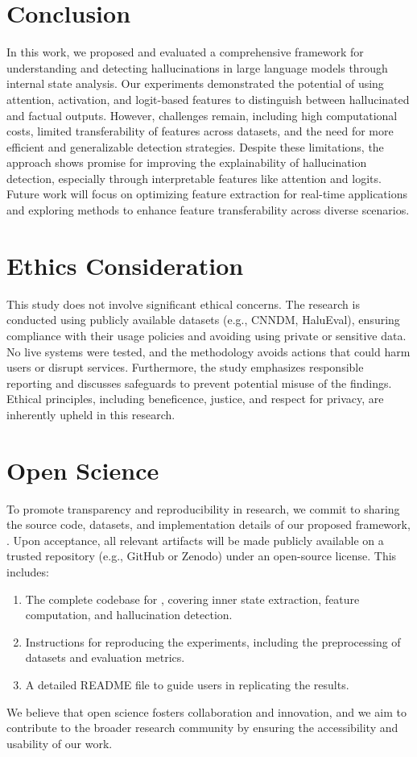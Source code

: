 \vspace{-10pt}
\section{Conclusion}\label{sec:conclusion}

In this work, we proposed and evaluated a comprehensive framework for understanding and detecting hallucinations in large language models through internal state analysis. Our experiments demonstrated the potential of using attention, activation, and logit-based features to distinguish between hallucinated and factual outputs. However, challenges remain, including high computational costs, limited transferability of features across datasets, and the need for more efficient and generalizable detection strategies. Despite these limitations, the approach shows promise for improving the explainability of hallucination detection, especially through interpretable features like attention and logits. Future work will focus on optimizing feature extraction for real-time applications and exploring methods to enhance feature transferability across diverse scenarios.

\newpage\clearpage

\section*{Ethics Consideration}

This study does not involve significant ethical concerns. The research is conducted using publicly available datasets (e.g., CNNDM, HaluEval), ensuring compliance with their usage policies and avoiding using private or sensitive data. No live systems were tested, and the methodology avoids actions that could harm users or disrupt services. Furthermore, the study emphasizes responsible reporting and discusses safeguards to prevent potential misuse of the findings. Ethical principles, including beneficence, justice, and respect for privacy, are inherently upheld in this research.

\section*{Open Science}

To promote transparency and reproducibility in research, we commit to sharing the source code, datasets, and implementation details of our proposed framework, \sysname. Upon acceptance, all relevant artifacts will be made publicly available on a trusted repository (e.g., GitHub or Zenodo) under an open-source license. This includes:
\begin{enumerate}
    \item The complete codebase for \sysname, covering inner state extraction, feature computation, and hallucination detection.
    \item Instructions for reproducing the experiments, including the preprocessing of datasets and evaluation metrics.
    \item A detailed README file to guide users in replicating the results.
\end{enumerate}

We believe that open science fosters collaboration and innovation, and we aim to contribute to the broader research community by ensuring the accessibility and usability of our work.